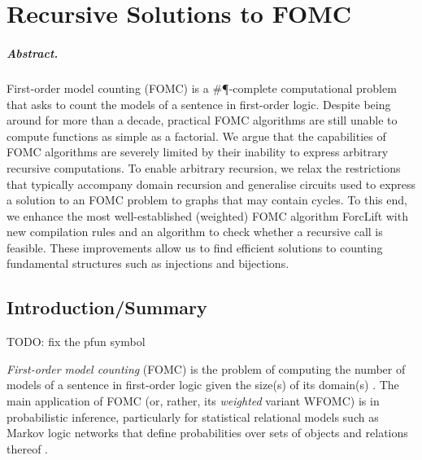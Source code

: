 \chapter{Recursive Solutions to FOMC} \label{chapter:wfomc}

\paragraph{Abstract.}
First-order model counting (FOMC) is a \#\P-complete computational problem that asks to count the models of a sentence in first-order logic. Despite being around for more than a decade, practical FOMC algorithms are still unable to compute functions as simple as a factorial. We argue that the capabilities of FOMC algorithms are severely limited by their inability to express arbitrary recursive computations. To enable arbitrary recursion, we relax the restrictions that typically accompany domain recursion and generalise circuits used to express a solution to an FOMC problem to graphs that may contain cycles. To this end, we enhance the most well-established (weighted) FOMC algorithm ForcLift with new compilation rules and an algorithm to check whether a recursive call is feasible. These improvements allow us to find efficient solutions to counting fundamental structures such as injections and bijections.

\clearpage
\section{Introduction/Summary}


TODO: fix the pfun symbol


\emph{First-order model counting} (FOMC) is the problem of computing the number of models of a sentence in first-order logic given the size(s) of its domain(s) \citep{DBLP:conf/ijcai/BroeckTMDR11}. The main application of FOMC (or, rather, its \emph{weighted} variant WFOMC) is in probabilistic inference, particularly for statistical relational models such as Markov logic networks that define probabilities over sets of objects and relations thereof \citep{DBLP:conf/ijcai/BroeckTMDR11,DBLP:journals/cacm/GogateD16}.

